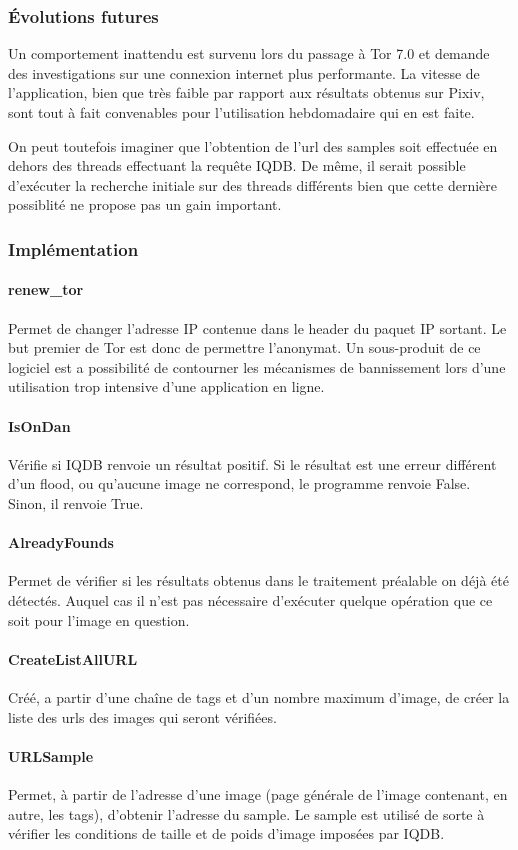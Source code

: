\documentclass[a4paper,12pt]{article}
\begin{document}
\subsubsection{Évolutions futures}
Un comportement inattendu est survenu lors du passage à Tor 7.0 et demande des investigations sur une connexion internet plus performante. La vitesse de l'application, bien que très faible par rapport aux résultats obtenus sur Pixiv, sont tout à fait convenables pour l'utilisation hebdomadaire qui en est faite.

On peut toutefois imaginer que l'obtention de l'url des samples soit effectuée en dehors des threads effectuant la requête IQDB. De même, il serait possible d'exécuter la recherche initiale sur des threads différents bien que cette dernière possiblité ne propose pas un gain important.
\subsubsection{Implémentation}
\paragraph{renew\_tor}
Permet de changer l'adresse IP contenue dans le header du paquet IP sortant. Le but premier de Tor est donc de permettre l'anonymat. Un sous-produit de ce logiciel est a possibilité de contourner les mécanismes de bannissement lors d'une utilisation trop intensive d'une application en ligne.
\paragraph{IsOnDan}
Vérifie si IQDB renvoie un résultat positif. Si le résultat est une erreur différent d'un flood, ou qu'aucune image ne correspond, le programme renvoie False. Sinon, il renvoie True.
\paragraph{AlreadyFounds}
Permet de vérifier si les résultats obtenus dans le traitement préalable on déjà été détectés. Auquel cas il n'est pas nécessaire d'exécuter quelque opération que ce soit pour l'image en question.
\paragraph{CreateListAllURL}
Créé, a partir d'une chaîne de tags et d'un nombre maximum d'image, de créer la liste des urls des images qui seront vérifiées.
\paragraph{URLSample}
Permet, à partir de l'adresse d'une image (page générale de l'image contenant, en autre, les tags), d'obtenir l'adresse du sample. Le sample est utilisé de sorte à vérifier les conditions de taille et de poids d'image imposées par IQDB.
\end{document}
